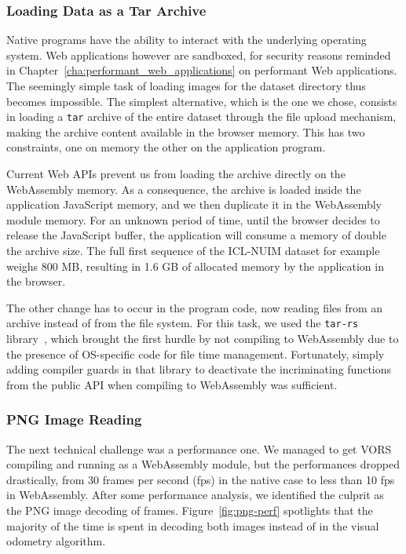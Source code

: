 \subsubsection{Loading Data as a Tar Archive}%

Native programs have the ability to interact with the underlying operating system.
Web applications however are sandboxed, for security reasons reminded
in Chapter~\ref{cha:performant_web_applications} on performant Web applications.
The seemingly simple task of loading images for the dataset directory
thus becomes impossible.
The simplest alternative, which is the one we chose,
consists in loading a \verb|tar| archive of the entire dataset through
the file upload mechanism, making the archive content available in the browser memory.
This has two constraints, one on memory the other on the application program.

Current Web APIs prevent us from loading the archive directly on the WebAssembly memory.
As a consequence, the archive is loaded inside the application JavaScript memory,
and we then duplicate it in the WebAssembly module memory.
For an unknown period of time, until the browser decides to release the JavaScript buffer,
the application will consume a memory of double the archive size.
The full first sequence of the ICL-NUIM dataset for example weighs 800 MB,
resulting in 1.6 GB of allocated memory by the application in the browser.

The other change has to occur in the program code, now reading files from an archive
instead of from the file system.
For this task, we used the \verb|tar-rs| library~\cite{tar-rs},
which brought the first hurdle by not compiling to WebAssembly
due to the presence of OS-specific code for file time management.
Fortunately, simply adding compiler guards in that library to deactivate
the incriminating functions from the public API when compiling to WebAssembly was sufficient.

\subsubsection{PNG Image Reading}%

The next technical challenge was a performance one.
We managed to get VORS compiling and running as a WebAssembly module,
but the performances dropped drastically, from 30 frames per second (fps)
in the native case to less than 10 fps in WebAssembly.
After some performance analysis, we identified the culprit as
the PNG image decoding of frames.
Figure~\ref{fig:png-perf} spotlights that the majority of the time
is spent in decoding both images instead of in the visual odometry algorithm.

